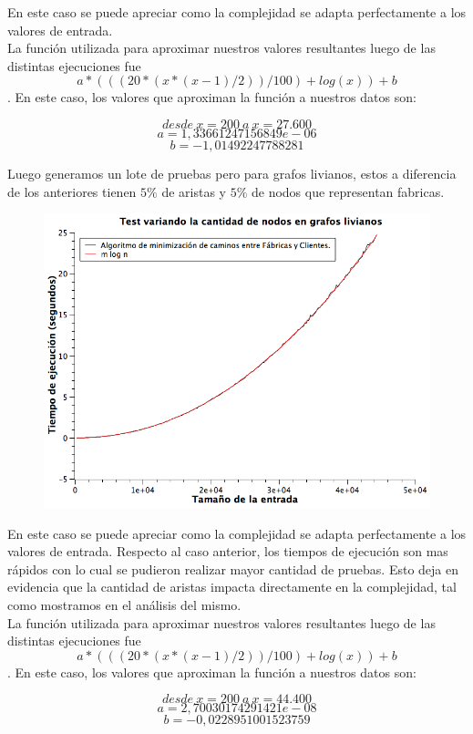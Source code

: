 En este caso se puede apreciar como la complejidad se adapta perfectamente a los valores de entrada.\\
La función utilizada para aproximar nuestros valores resultantes luego de las distintas ejecuciones fue $$a*(((20*(x*(x-1)/2)) / 100) + log(x)) + b$$.
En este caso, los valores que aproximan la función a nuestros datos son:

$$desde\ x = 200\ a\ x = 27.600 $$
$$a  = 1,33661247156849e-06$$
$$b  = -1,01492247788281 $$

\newpage
Luego generamos un lote de pruebas pero para grafos livianos, estos a diferencia de los anteriores tienen $5\%$ de aristas y $5\%$ de nodos que representan fabricas.

\begin{figure}[H]
	\includegraphics[width=350pt]{../tests/ej3/EJ3-nodo-var-liviano.png}
\end{figure}

En este caso se puede apreciar como la complejidad se adapta perfectamente a los valores de entrada. Respecto al caso anterior, los tiempos de ejecución son mas rápidos con lo cual se pudieron realizar mayor cantidad de pruebas. Esto deja en evidencia que la cantidad de aristas impacta directamente en la complejidad, tal como mostramos en el análisis del mismo.\\
La función utilizada para aproximar nuestros valores resultantes luego de las distintas ejecuciones fue $$ a*(((20*(x*(x-1)/2)) / 100) + log(x)) + b $$.
En este caso, los valores que aproximan la función a nuestros datos son:

$$desde\ x = 200\ a\ x = 44.400 $$
$$a  = 2,70030174291421e-08$$
$$b  = -0,0228951001523759 $$


